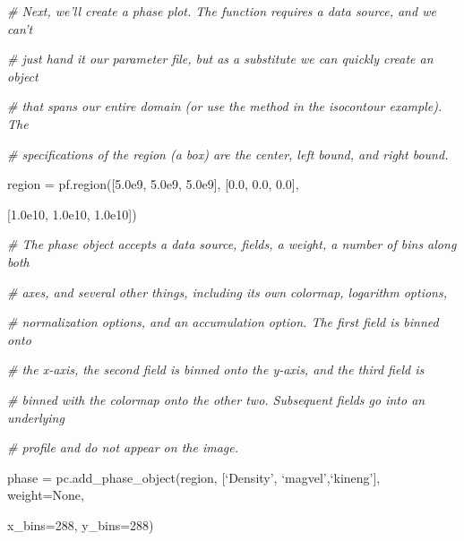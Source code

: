 {\it\# Next, we'll create a phase plot. The function requires a data source, and we can't}
{\setlength{\parskip}{0pt}

{\it\# just hand it our parameter file, but as a substitute we can quickly create an object}

{\it\# that spans our entire domain (or use the method in the isocontour example). The}

{\it\#  specifications of the region (a box) are the center, left bound, and right bound.}

region = pf.region([5.0e9, 5.0e9, 5.0e9], [0.0, 0.0, 0.0],
}

{\setlength{\parindent}{100pt}[1.0e10, 1.0e10, 1.0e10])}

{\it\# The phase object accepts a data source, fields, a weight, a number of bins along both}
{\setlength{\parskip}{0pt}

{\it\# axes, and several other things, including its own colormap, logarithm options,}

{\it\# normalization options, and an accumulation option. The first field is binned onto}

{\it\# the x-axis, the second field is binned onto the y-axis, and the third field is}

{\it\# binned with the colormap onto the other two. Subsequent fields go into an underlying}

{\it\# profile and do not appear on the image.}

phase = pc.add\_phase\_object(region, [`Density', `magvel',`kineng'], weight=None,
}

{\setlength{\parindent}{143pt}x\_bins=288, y\_bins=288)}

